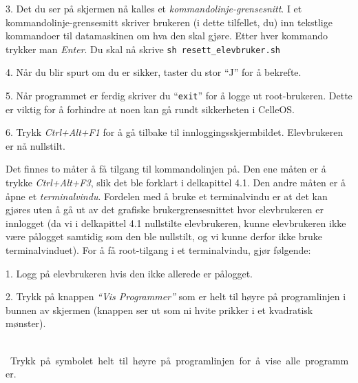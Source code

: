 \item{3.} Det du ser p\aa{} skjermen n\aa{} kalles et {\it kommando\-linje-grense\-snitt}. I et kommando\-linje-grense\-snitt skriver brukeren (i dette tilfellet, du) inn tekstlige kommandoer til datamaskinen om hva den skal gj\o re. Etter hver kommando trykker man {\it Enter}. Du skal n\aa{} skrive
\medskip
{\tt sh resett\_elevbruker.sh}
\medskip
\item{4.} N\aa r du  blir spurt om du er sikker, taster du stor ``J'' for \aa{} bekrefte.

\item{5.} N\aa r programmet er ferdig skriver du ``{\tt exit}'' for \aa{} logge ut root-brukeren. Dette er viktig for \aa{} forhindre at noen kan g\aa{} rundt sikkerheten i CelleOS.

\item{6.} Trykk {\it Ctrl+Alt+F1} for \aa{} g\aa{} tilbake til inn\-loggings\-skjerm\-bildet. Elev\-brukeren er n\aa{} nullstilt.


Det finnes to m\aa ter \aa{} f\aa{} tilgang til kommando\-linjen p\aa . Den ene m\aa ten er \aa{} trykke {\it Ctrl+Alt+F3}, slik det ble forklart i delkapittel 4.1. Den andre m\aa ten er \aa{} \aa pne et {\it terminalvindu}. Fordelen med \aa{} bruke et terminalvindu er at det kan gj\o res uten \aa{} g\aa{} ut av det grafiske brukergrensesnittet hvor elevbrukeren er innlogget (da vi i delkapittel 4.1 nullstilte elevbrukeren, kunne elevbrukeren ikke v\ae re p\aa logget samtidig som den ble nullstilt, og vi kunne derfor ikke bruke terminalvinduet). For \aa{} f\aa{} root-tilgang i et terminalvindu, gj\o r f\o lgende:
\item{1.} Logg p\aa{} elevbrukeren hvis den ikke allerede er p\aa logget.
\item{2.} Trykk p\aa{} knappen {\it ``Vis Programmer''} som er helt til h\o yre p\aa{} programlinjen i bunnen av skjermen (knappen ser ut som ni hvite prikker i et kvadratisk m\o nster).

\medskip
\centerline{\baselineskip=9pt \vbox{\hbox{\epsfxsize 5cm  \epsfxsize 3cm }\vskip 1pt \hbox{\vbox{\hsize=8cm \noindent \fc \baselineskip=9pt Trykk p\aa{} symbolet helt til h\o yre p\aa{} programlinjen for \aa{} vise alle programmer.}}}}
\medskip



